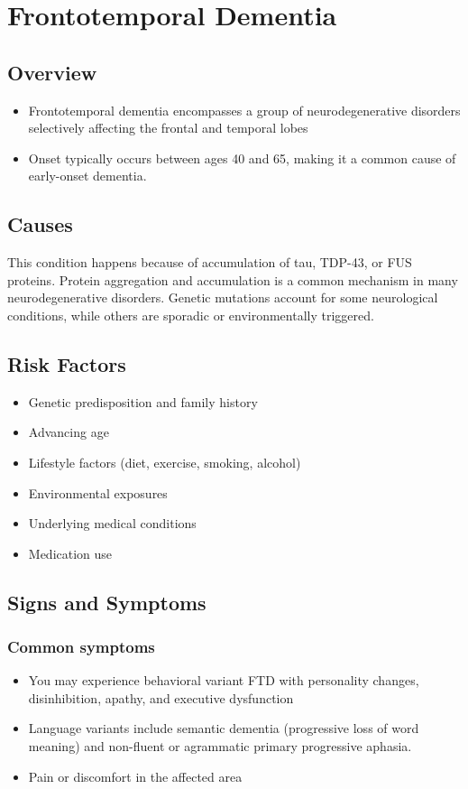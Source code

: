 \chapter{Frontotemporal Dementia}
\label{sec:Frontotemporal Dementia}

\section{Overview}


\begin{itemize}[noitemsep]
  \item Frontotemporal dementia encompasses a group of neurodegenerative disorders selectively affecting the frontal and temporal lobes
  \item Onset typically occurs between ages 40 and 65, making it a common cause of early-onset dementia.
\end{itemize}
\section{Causes}
This condition happens because of accumulation of tau, TDP-43, or FUS proteins.    Protein aggregation and accumulation is a common mechanism in many neurodegenerative disorders.  Genetic mutations account for some neurological conditions, while others are sporadic or environmentally triggered.   
\section{Risk Factors}
\begin{itemize}[noitemsep]
  \item Genetic predisposition and family history
  \item Advancing age
  \item Lifestyle factors (diet, exercise, smoking, alcohol)
  \item Environmental exposures
  \item Underlying medical conditions
  \item Medication use
\end{itemize}
\section{Signs and Symptoms}
\subsection{Common symptoms}
\begin{itemize}[noitemsep]
  \item You may experience behavioral variant FTD with personality changes, disinhibition, apathy, and executive dysfunction
  \item Language variants include semantic dementia (progressive loss of word meaning) and non-fluent or agrammatic primary progressive aphasia.
  \item Pain or discomfort in the affected area
  \end{itemize}
